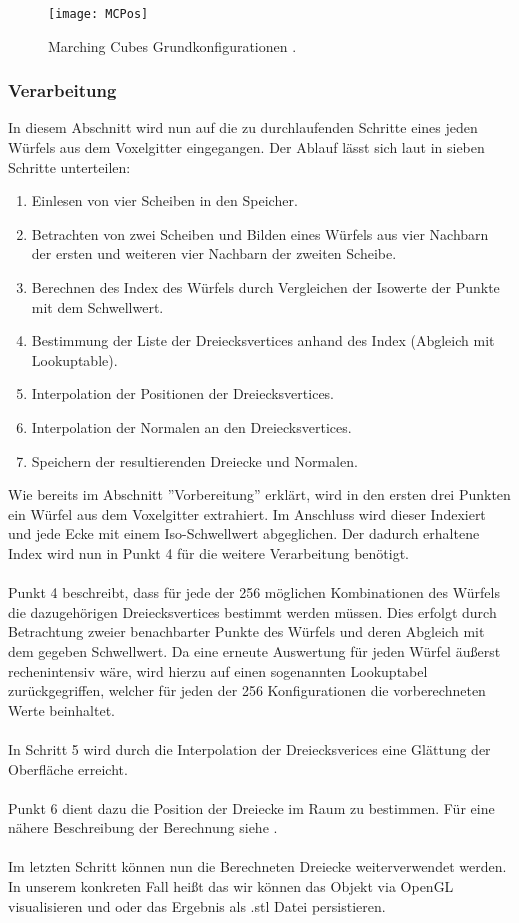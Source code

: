 \begin{figure}[H]
	\centering
	\texttt{[image: MCPos]}
	\caption{Marching Cubes Grundkonfigurationen \citep{MCAlgo}.}
	\label{fig:MCPos}
\end{figure}

\subsubsection{Verarbeitung}
In diesem Abschnitt wird nun auf die zu durchlaufenden Schritte eines jeden Würfels aus dem Voxelgitter eingegangen. Der Ablauf lässt sich laut \citep{MCAlgo} in sieben Schritte unterteilen:\\
\begin{enumerate}
	\item Einlesen von vier Scheiben in den Speicher.
	\item Betrachten von zwei Scheiben und Bilden eines Würfels aus vier Nachbarn der ersten und weiteren vier Nachbarn der zweiten Scheibe.
	\item Berechnen des Index des Würfels durch Vergleichen der Isowerte der Punkte mit dem Schwellwert.
	\item Bestimmung der Liste der Dreiecksvertices anhand des Index (Abgleich mit Lookuptable).
	\item Interpolation der Positionen der Dreiecksvertices.
	\item Interpolation der Normalen an den Dreiecksvertices.
	\item Speichern der resultierenden Dreiecke und Normalen.\\
\end{enumerate}

\noindent Wie bereits im Abschnitt ''Vorbereitung'' erklärt, wird in den ersten drei Punkten ein Würfel aus dem Voxelgitter extrahiert. Im Anschluss wird dieser Indexiert und jede Ecke mit einem Iso-Schwellwert abgeglichen. Der dadurch erhaltene Index wird nun in Punkt 4 für die weitere Verarbeitung benötigt. \\
\\
Punkt 4 beschreibt, dass für jede der 256 möglichen Kombinationen des Würfels die dazugehörigen Dreiecksvertices bestimmt werden müssen. Dies erfolgt durch Betrachtung zweier benachbarter Punkte des Würfels und deren Abgleich mit dem gegeben Schwellwert. Da eine erneute Auswertung für jeden Würfel äußerst rechenintensiv wäre, wird hierzu auf einen sogenannten Lookuptabel zurückgegriffen, welcher für jeden der 256 Konfigurationen die vorberechneten Werte beinhaltet. \\
\\
In Schritt 5 wird durch die Interpolation der Dreiecksverices eine Glättung der Oberfläche erreicht.\\
\\
Punkt 6 dient dazu die Position der Dreiecke im Raum zu bestimmen. Für eine nähere Beschreibung der Berechnung siehe \citep{MCAlgo}.\\
\\
Im letzten Schritt können nun die Berechneten Dreiecke weiterverwendet werden. In unserem konkreten Fall heißt das wir können das Objekt via OpenGL visualisieren und oder das Ergebnis als .stl Datei persistieren.

